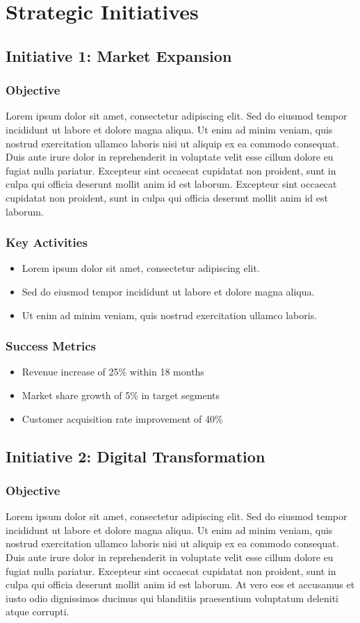 \documentclass[11pt,a4paper]{article}
\newcommand{\loremtext}[1]{%
  Lorem ipsum dolor sit amet, consectetur adipiscing elit. Sed do eiusmod tempor incididunt ut labore et dolore magna aliqua. Ut enim ad minim veniam, quis nostrud exercitation ullamco laboris nisi ut aliquip ex ea commodo consequat. Duis aute irure dolor in reprehenderit in voluptate velit esse cillum dolore eu fugiat nulla pariatur. Excepteur sint occaecat cupidatat non proident, sunt in culpa qui officia deserunt mollit anim id est laborum.%
}
\begin{document}
\section{Strategic Initiatives}

\subsection{Initiative 1: Market Expansion}

\subsubsection{Objective}
\loremtext{8} Excepteur sint occaecat cupidatat non proident, sunt in culpa qui officia deserunt mollit anim id est laborum.

\subsubsection{Key Activities}
\begin{itemize}
  \item Lorem ipsum dolor sit amet, consectetur adipiscing elit.
  \item Sed do eiusmod tempor incididunt ut labore et dolore magna aliqua.
  \item Ut enim ad minim veniam, quis nostrud exercitation ullamco laboris.
\end{itemize}

\subsubsection{Success Metrics}
\begin{itemize}
  \item Revenue increase of 25\% within 18 months
  \item Market share growth of 5\% in target segments
  \item Customer acquisition rate improvement of 40\%
\end{itemize}

\subsection{Initiative 2: Digital Transformation}

\subsubsection{Objective}
\loremtext{9} At vero eos et accusamus et iusto odio dignissimos ducimus qui blanditiis praesentium voluptatum deleniti atque corrupti.
\end{document}
